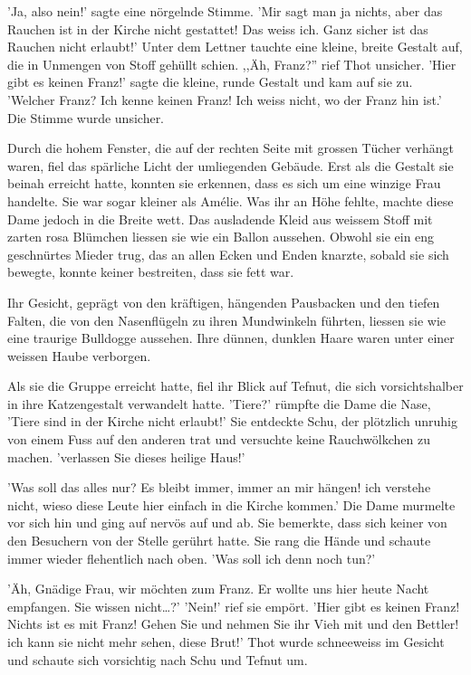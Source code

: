 \documentclass[11pt,titlepage,a5paper]{book}
\begin{document}
'Ja, also nein!' sagte eine nörgelnde Stimme. 'Mir sagt man ja nichts, aber das Rauchen ist in der Kirche nicht gestattet! Das weiss ich. Ganz sicher ist das Rauchen nicht erlaubt!' Unter dem Lettner tauchte eine kleine, breite Gestalt auf, die in Unmengen von Stoff gehüllt schien. ,,Äh, Franz?'' rief Thot unsicher. 'Hier gibt es keinen Franz!' sagte die kleine, runde Gestalt und kam auf sie zu. 'Welcher Franz? Ich kenne keinen Franz! Ich weiss nicht, wo der Franz hin ist.' Die Stimme wurde unsicher.

Durch die hohem Fenster, die auf der rechten Seite mit grossen Tücher verhängt waren, fiel das spärliche Licht der umliegenden Gebäude. Erst als die Gestalt sie beinah erreicht hatte, konnten sie erkennen, dass es sich um eine winzige Frau handelte. Sie war sogar kleiner als Amélie. Was ihr an Höhe fehlte, machte diese Dame jedoch in die Breite wett. Das ausladende Kleid aus weissem Stoff mit zarten rosa Blümchen liessen sie wie ein Ballon aussehen. Obwohl sie ein eng geschnürtes Mieder trug, das an allen Ecken und Enden knarzte, sobald sie sich bewegte, konnte keiner bestreiten, dass sie fett war.

Ihr Gesicht, geprägt von den kräftigen, hängenden Pausbacken und den tiefen Falten, die von den Nasenflügeln zu ihren Mundwinkeln führten, liessen sie wie eine traurige Bulldogge aussehen. Ihre dünnen, dunklen Haare waren unter einer weissen Haube verborgen.

Als sie die Gruppe erreicht hatte, fiel ihr Blick auf Tefnut, die sich vorsichtshalber in ihre Katzengestalt verwandelt hatte. 'Tiere?' rümpfte die Dame die Nase, 'Tiere sind in der Kirche nicht erlaubt!' Sie entdeckte Schu, der plötzlich unruhig von einem Fuss auf den anderen trat und versuchte keine Rauchwölkchen zu machen. 'verlassen Sie dieses heilige Haus!'

'Was soll das alles nur? Es bleibt immer, immer an mir hängen! ich verstehe nicht, wieso diese Leute hier einfach in die Kirche kommen.' Die Dame murmelte vor sich hin und ging auf nervös auf und ab. Sie bemerkte, dass sich keiner von den Besuchern von der Stelle gerührt hatte. Sie rang die Hände und schaute immer wieder flehentlich nach oben. 'Was soll ich denn noch tun?'

'Äh, Gnädige Frau, wir möchten zum Franz. Er wollte uns hier heute Nacht empfangen. Sie wissen nicht\dots?' 'Nein!' rief sie empört. 'Hier gibt es keinen Franz! Nichts ist es mit Franz! Gehen Sie und nehmen Sie ihr Vieh mit und den Bettler! ich kann sie nicht mehr sehen, diese Brut!' Thot wurde schneeweiss im Gesicht und schaute sich vorsichtig nach Schu und Tefnut um.
\end{document}
